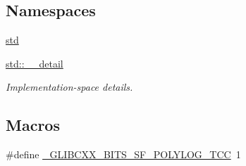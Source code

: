 \subsection*{Namespaces}
\begin{DoxyCompactItemize}
\item 
 \hyperlink{namespacestd}{std}
\item 
 \hyperlink{namespacestd_1_1____detail}{std\+::\+\_\+\+\_\+detail}
\begin{DoxyCompactList}\small\item\em Implementation-\/space details. \end{DoxyCompactList}\end{DoxyCompactItemize}
\subsection*{Macros}
\begin{DoxyCompactItemize}
\item 
\#define \hyperlink{sf__polylog_8tcc_ab6c10ff949c404f48f72645a3fe8a674}{\+\_\+\+G\+L\+I\+B\+C\+X\+X\+\_\+\+B\+I\+T\+S\+\_\+\+S\+F\+\_\+\+P\+O\+L\+Y\+L\+O\+G\+\_\+\+T\+CC}~1
\end{DoxyCompactItemize}
